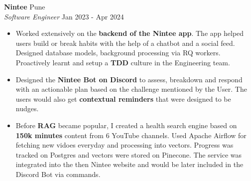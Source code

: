 \documentclass[a4paper]{article}
\begin{document}
\vspace*{2mm}

\vspace{1mm}
\textbf{Nintee} \hfill Pune\\
\textit{Software Engineer} \hfill Jan 2023 - Apr 2024\\
\vspace{-1mm}
\begin{itemize} \itemsep 1pt
    \item Worked extensively on the \textbf{backend of the Nintee app}. The app helped users build or break habits with the help of a chatbot and a social feed. Designed database models, background processing via RQ workers. Proactively learnt and setup a \textbf{TDD} culture in the Engineering team.
    \item Designed the \textbf{Nintee Bot on Discord} to assess, breakdown and respond with an actionable plan based on the challenge mentioned by the User. The users would also get \textbf{contextual reminders} that were designed to be nudges.
    \item Before \textbf{RAG} became popular, I created a health search engine based on \textbf{150k minutes} content from 6 YouTube channels. Used Apache Airflow for fetching new vidoes everyday and processing into vectors. Progress was tracked on Postgres and vectors were stored on Pinecone. The service was integrated into the then Nintee website and would be later included in the Discord Bot via commands. 
\end{itemize}

\vspace*{2mm}
\end{document}
